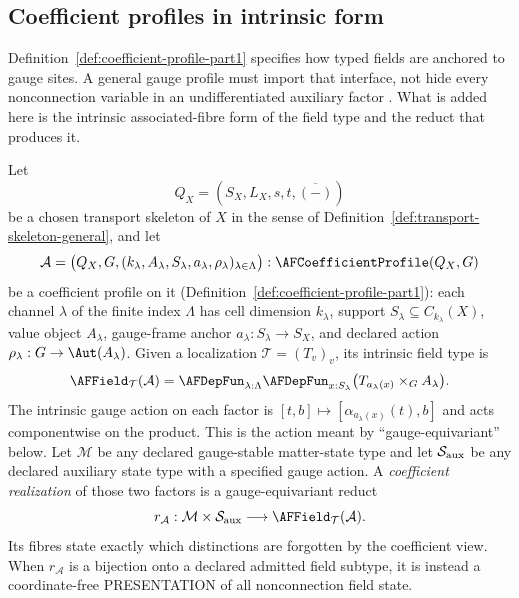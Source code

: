 \subsection{Coefficient profiles in intrinsic form}

Definition~\ref{def:coefficient-profile-part1} specifies how typed fields are
anchored to gauge sites.  A general gauge profile must import that interface,
not hide every nonconnection variable in an undifferentiated auxiliary factor
\cite{ArtC,PatternGeometry}.  What is added here is the intrinsic
associated-fibre form of the field type and the reduct that produces it.

\begin{definition}
\label{def:coefficient-bridge}
Let
\[
 Q_X=(S_X,L_X,s,t,\overline{(-)})
\]
be a chosen transport skeleton of $X$ in the sense of
Definition~\ref{def:transport-skeleton-general}, and let
\[
 \mathcal A=
 \bigl(Q_X,G,(k_\lambda,A_\lambda,S_\lambda,
                    a_\lambda,\rho_\lambda)_{\lambda\in\Lambda}\bigr)
 :\AFCoefficientProfile(Q_X,G)
\]
be a coefficient profile on it (Definition~\ref{def:coefficient-profile-part1}):
each channel $\lambda$ of the finite index $\Lambda$ has cell dimension
$k_\lambda$, support $S_\lambda\subseteq C_{k_\lambda}(X)$, value object
$A_\lambda$, gauge-frame anchor $a_\lambda:S_\lambda\to S_X$, and declared
action $\rho_\lambda:G\to\Aut(A_\lambda)$.  Given a localization
$\mathcal T=(T_v)_v$, its intrinsic field type is
\[
 \AFField_{\mathcal T}(\mathcal A)
 =\AFDepFun_{\lambda:\Lambda}
   \AFDepFun_{x: S_\lambda}
   \bigl(T_{a_\lambda(x)}\times_G A_\lambda\bigr).
\]
The intrinsic gauge action on each factor is
$[t,b]\mapsto[\alpha_{a_\lambda(x)}(t),b]$ and acts componentwise on the
product.  This is the action meant by ``gauge-equivariant'' below.
Let $\mathcal M$ be any declared gauge-stable matter-state type and let
$\mathcal S_{\rm aux}$ be any declared auxiliary state type with a specified
gauge action.  A \emph{coefficient realization} of those two factors is a
gauge-equivariant reduct
\[
 r_{\mathcal A}:\mathcal M\times\mathcal S_{\rm aux}
       \longrightarrow\AFField_{\mathcal T}(\mathcal A).
\]
Its fibres state exactly which distinctions are forgotten by the coefficient
view.  When $r_{\mathcal A}$ is a bijection onto a declared admitted field
subtype, it is instead a coordinate-free PRESENTATION of all nonconnection
field state.
\end{definition}

